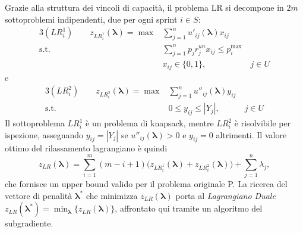 \documentclass[12pt,a4paper,openright,twoside]{book}
\begin{document}
Grazie alla struttura dei vincoli di capacità, il problema LR si decompone in $2m$ sottoproblemi indipendenti, due per ogni sprint $i \in S$:
\begin{alignat}{3}
(LR^1_i) \qquad z_{LR^1_i}(\boldsymbol{\lambda})  = \max  & \sum_{j=1}^{n} u'_{ij}(\boldsymbol{\lambda}) x_{ij}    &\    \label{Eq1.LR1.1}\\
  \text{s.t. } & \sum_{j=1}^{n} p_j r_j^{un} x_{ij} \leq p_i^{\max}                  &\              \label{Eq1.LR1.2}\\
        & x_{ij} \in \{0,1\},                                                &\ j \in U      \label{Eq1.LR1.3}
\end{alignat}
e
\begin{alignat}{3}
(LR^2_i) \qquad z_{LR^2_i}(\boldsymbol{\lambda})  = \max  & \sum_{j=1}^{n} u''_{ij}(\boldsymbol{\lambda}) y_{ij}   &\    \label{Eq1.LR2.1}\\
  \text{s.t. } & 0 \leq y_{ij} \leq |Y_j|,                                          &\ j \in U      \label{Eq1.LR2.2}
\end{alignat}
Il sottoproblema $LR^1_i$ è un problema di knapsack, mentre $LR^2_i$ è risolvibile per ispezione, assegnando $y_{ij}=|Y_j|$ se $u''_{ij}(\boldsymbol{\lambda})>0$ e $y_{ij}=0$ altrimenti. Il valore ottimo del rilassamento lagrangiano è quindi
\begin{equation}
z_{LR}(\boldsymbol{\lambda}) = \sum_{i=1}^{m} (m-i+1)\bigl(z_{LR^1_i}(\boldsymbol{\lambda}) + z_{LR^2_i}(\boldsymbol{\lambda})\bigr) + \sum_{j=1}^{n} \lambda_j,
\end{equation}
che fornisce un upper bound valido per il problema originale P. La ricerca del vettore di penalità $\boldsymbol{\lambda}^*$ che minimizza $z_{LR}(\boldsymbol{\lambda})$ porta al \emph{Lagrangiano Duale} $z_{LR}(\boldsymbol{\lambda}^*) = \min_{\boldsymbol{\lambda}}\{z_{LR}(\boldsymbol{\lambda})\}$, affrontato qui tramite un algoritmo del subgradiente.
\end{document}
